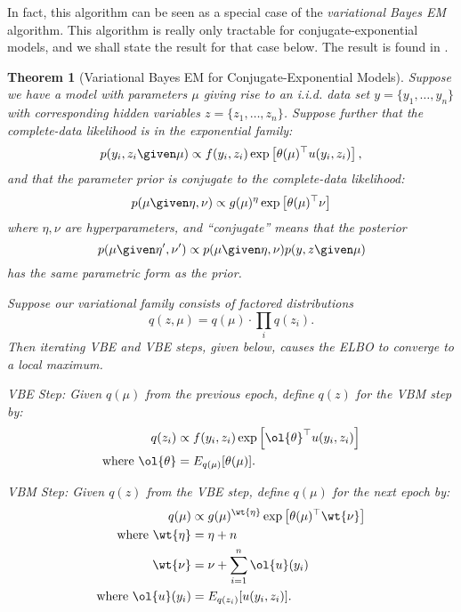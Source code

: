 \documentclass{article}
\newtheorem{thm}{Theorem}
\begin{document}
In fact, this algorithm can be seen as a special case of the \emph{variational Bayes EM} algorithm. This algorithm is really only tractable for conjugate-exponential models, and we shall state the result for that case below. The result is found in \cite{Beal03}.

\begin{thm}[Variational Bayes EM for Conjugate-Exponential Models]\label{thm:vbem}
Suppose we have a model with parameters $\mu$ giving rise to an i.i.d. data set $y = \{y_1, \dots, y_n\}$ with corresponding hidden variables $z = \{z_1, \dots, z_n\}$. Suppose further that the complete-data likelihood is in the exponential family:
\[ p(y_i, z_i \given \mu) \propto f(y_i, z_i) \exp\left[ \theta(\mu)^\top u(y_i, z_i) \right], \]
and that the parameter prior is conjugate to the complete-data likelihood:
\[ p(\mu \given \eta, \nu) \propto g(\mu)^\eta \exp\left[ \theta(\mu)^\top \nu \right] \]
where $\eta, \nu$ are hyperparameters, and ``conjugate'' means that the posterior
\[ p(\mu \given \eta', \nu') \propto p(\mu \given \eta, \nu) p(y, z \given \mu) \]
has the same parametric form as the prior.

Suppose our variational family consists of factored distributions
\[ q(z, \mu) = q(\mu) \cdot \prod_i q(z_i). \]
Then iterating VBE and VBE steps, given below, causes the ELBO to converge to a local maximum.

\emph{VBE Step}: Given $q(\mu)$ from the previous epoch, define $q(z)$ for the VBM step by:
\begin{align*}
q(z_i) &\propto f(y_i, z_i) \exp\left[ \ol{\theta}^\top u(y_i, z_i) \right] \\
\text{where }\ol{\theta} &= E_{q(\mu)}[\theta(\mu)].
\end{align*}

\emph{VBM Step}: Given $q(z)$ from the VBE step, define $q(\mu)$ for the next epoch by:
\begin{align*}
q(\mu) &\propto g(\mu)^{\wt{\eta}} \exp\left[ \theta(\mu)^\top \wt{\nu} \right] \\
\text{where }\wt{\eta} &= \eta + n \\
\wt{\nu} &= \nu + \sum_{i=1}^n \ol{u}(y_i) \\
\text{where }\ol{u}(y_i) &= E_{q(z_i)}[u(y_i, z_i)].
\end{align*}
\end{thm}
\end{document}
